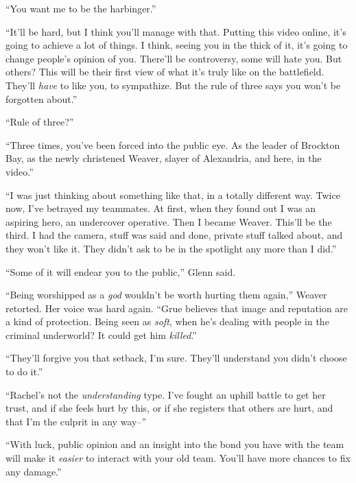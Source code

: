 ``You want me to be the harbinger.''



``It'll be hard, but I think you'll manage with that.  Putting this video online, it's going to achieve a lot of things.  I think, seeing you in the thick of it, it's going to change people's opinion of you.  There'll be controversy, some will hate you.  But others?  This will be their first view of what it's truly like on the battlefield.  They'll \emph{have} to like you, to sympathize.  But the rule of three says you won't be forgotten about.''



``Rule of three?''



``Three times, you've been forced into the public eye.  As the leader of Brockton Bay, as the newly christened Weaver, slayer of Alexandria, and here, in the video.''



``I was just thinking about something like that, in a totally different way.  Twice now, I've betrayed my teammates.  At first, when they found out I was an aspiring hero, an undercover operative.  Then I became Weaver.  This'll be the third.  I had the camera, stuff was said and done, private stuff talked about, and they won't like it.  They didn't ask to be in the spotlight any more than I did.''



``Some of it will endear you to the public,'' Glenn said.



``Being worshipped as a \emph{god} wouldn't be worth hurting them again,'' Weaver retorted.  Her voice was hard again.  ``Grue believes that image and reputation are a kind of protection.  Being seen as \emph{soft}, when he's dealing with people in the criminal underworld?  It could get him \emph{killed}.''



``They'll forgive you that setback, I'm sure.  They'll understand you didn't choose to do it.''



``Rachel's not the \emph{understanding} type.  I've fought an uphill battle to get her trust, and if she feels hurt by this, or if she registers that others are hurt, and that I'm the culprit in any way--''



``With luck, public opinion and an insight into the bond you have with the team will make it \emph{easier} to interact with your old team.  You'll have more chances to fix any damage.''



